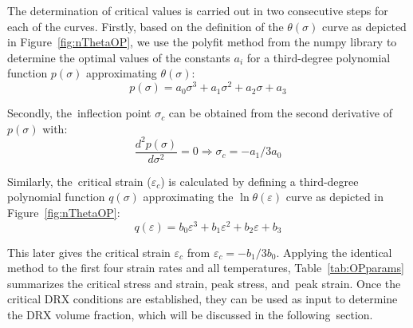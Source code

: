 \documentclass[metals,article,accept,pdftex,moreauthors]{Definitions/mdpi}
\begin{document}
The determination of critical values is carried out in two consecutive steps for each of the curves.
Firstly, based on the definition of the $\theta(\sigma)$ curve as depicted in Figure~\ref{fig:nThetaOP}, we use the polyfit method from the numpy library to determine the optimal values of the constants $a_i$ for a third-degree polynomial function $p(\sigma)$ approximating $\theta(\sigma)$:
\begin{equation}
p(\sigma) = a_0\sigma^3 + a_1\sigma^2 + a_2\sigma + a_3
\end{equation}

Secondly, %
 the~inflection point $\sigma_c$ can be obtained from the second derivative of $p(\sigma)$ with:
\begin{equation}
\frac{d^2 p(\sigma)}{d \sigma^2} = 0 \Longrightarrow \sigma_c = -a_1/3a_0
\end{equation}

Similarly, %
 the~critical strain ($\varepsilon_c$) is calculated by defining a third-degree polynomial function $q(\sigma)$ approximating the $\ln \theta(\varepsilon)$ curve as depicted in Figure~\ref{fig:nThetaOP}:
\begin{equation}
q(\varepsilon) = b_0\varepsilon^3 + b_1\varepsilon^2 + b_2\varepsilon + b_3
\end{equation}

This %
 later gives the critical strain $\varepsilon_c$ from $\varepsilon_c = -b_1/3b_0$.
Applying the identical method to the first four strain rates and all temperatures, Table~\ref{tab:OPparams} summarizes the critical stress and strain, peak stress, and~peak strain.
Once the critical DRX conditions are established, they can be used as input to determine the DRX volume fraction, which will be discussed in the following~section.
\end{document}
